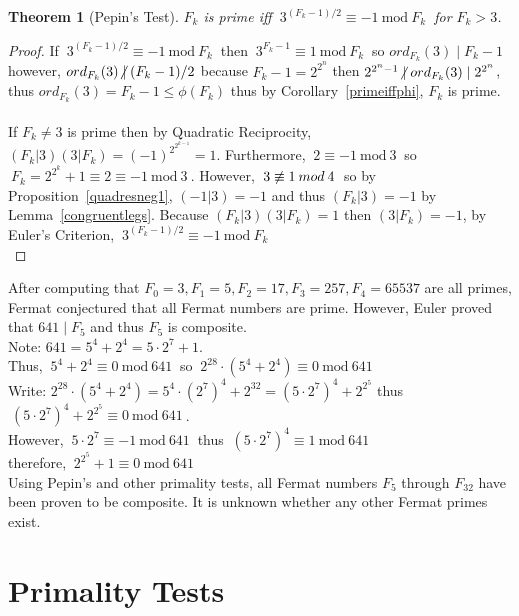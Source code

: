 \documentclass[12pt]{extarticle}
\newcommand{\divides}{\mid}
\newcommand{\ndivides}{\centernot \mid}
\newtheorem{theorem}{Theorem}[section]
\renewcommand{\mod}[3]{\: #1 \equiv #2 \: \mathrm{mod} \: #3 \:}
\newcommand{\nmod}[3]{\: #1 \centernot \equiv #2 \: mod \: #3 \:}
\begin{document}
\begin{theorem}[Pepin's Test]
$F_k$ is prime iff $\mod{3^{(F_k-1)/2}}{-1}{F_k}$ for $F_k > 3$.
\end{theorem}

\begin{proof}
If $\mod{3^{(F_k-1)/2}}{-1}{F_k}$ then $\mod{3^{F_k-1}}{1}{F_k}$ so $ord_{F_k}(3) \divides F_k - 1$  \\ however, $ord_{F_k}(3) \ndivides (F_k - 1)/2$ because $F_k - 1 = 2^{2^n}$ then $2^{2^n-1} \ndivides ord_{F_k}(3) \divides 2^{2^n}$, \\ thus $ord_{F_k}(3) = F_k - 1 \le \phi (F_k)$ thus by Corollary~\ref{primeiffphi}, $F_k$ is prime. \\\\ If $F_k \neq 3$ is prime then by Quadratic Reciprocity, $(F_k|3)(3|F_k) = (-1)^{2^{2^{k-1}}} = 1$. Furthermore, $\mod{2}{-1}{3}$ so $\mod{F_k = 2^{2^k} + 1}{2 \equiv - 1}{3}$. However, $\nmod{3}{1}{4}$ so by Proposition~\ref{quadresneg1}, $(-1|3) = -1$ and thus $(F_k|3) = -1$ by Lemma~\ref{congruentlegs}. Because $(F_k|3)(3|F_k) = 1$ then $(3|F_k) = -1$, by Euler's Criterion, $\mod{3^{(F_k-1)/2}}{-1}{F_k}$\\
\end{proof}

\noindent After computing that $F_0 = 3, F_1 = 5, F_2 = 17, F_3 = 257, F_4 = 65537$ are all primes, Fermat conjectured that all Fermat numbers are prime. However, Euler proved that $641 \divides F_5$  and thus $F_5$ is composite. \\

\noindent Note: $641 = 5^4 + 2^4 = 5 \cdot 2^7 + 1$. \\ Thus, $\mod{5^4 + 2^4}{0}{641}$ so $\mod{2^{28} \cdot (5^4 + 2^4)}{0}{641}$ \\
Write: $2^{28} \cdot (5^4 + 2^4) = 5^4 \cdot (2^7)^4 + 2^{32} = (5 \cdot 2^7)^4 + 2^{2^5}$ thus $\mod{(5 \cdot 2^7)^4 + 2^{2^5}}{0}{641}$. \\ However, $\mod{5 \cdot 2^7}{-1}{641}$ thus $\mod{(5 \cdot 2^7)^4}{1}{641}$ \\ therefore, $\mod{2^{2^5} + 1}{0}{641}$ \\

\noindent Using Pepin's and other primality tests, all Fermat numbers $F_5$ through $F_{32}$ have been proven to be composite. It is unknown whether any other Fermat primes exist.


\newpage

\section{Primality Tests}
\end{document}
